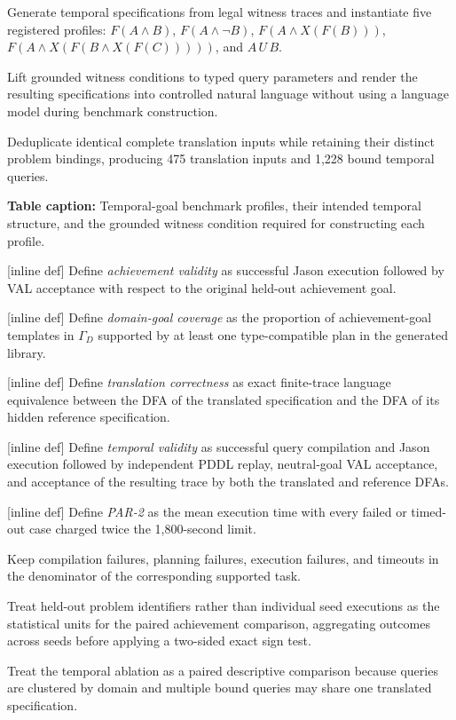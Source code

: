 Generate temporal specifications from legal witness traces and instantiate five registered profiles: \(F(A\land B)\), \(F(A\land\neg B)\), \(F(A\land X(F(B)))\), \(F(A\land X(F(B\land X(F(C)))))\), and \(A\,U\,B\).

Lift grounded witness conditions to typed query parameters and render the resulting specifications into controlled natural language without using a language model during benchmark construction.

Deduplicate identical complete translation inputs while retaining their distinct problem bindings, producing 475 translation inputs and 1,228 bound temporal queries.

\textbf{Table caption:} Temporal-goal benchmark profiles, their intended temporal structure, and the grounded witness condition required for constructing each profile.

[inline def] Define \emph{achievement validity} as successful Jason execution followed by VAL acceptance with respect to the original held-out achievement goal.

[inline def] Define \emph{domain-goal coverage} as the proportion of achievement-goal templates in \(\Gamma_D\) supported by at least one type-compatible plan in the generated library.

[inline def] Define \emph{translation correctness} as exact finite-trace language equivalence between the DFA of the translated specification and the DFA of its hidden reference specification.

[inline def] Define \emph{temporal validity} as successful query compilation and Jason execution followed by independent PDDL replay, neutral-goal VAL acceptance, and acceptance of the resulting trace by both the translated and reference DFAs.

[inline def] Define \emph{PAR-2} as the mean execution time with every failed or timed-out case charged twice the 1,800-second limit.

Keep compilation failures, planning failures, execution failures, and timeouts in the denominator of the corresponding supported task.

Treat held-out problem identifiers rather than individual seed executions as the statistical units for the paired achievement comparison, aggregating outcomes across seeds before applying a two-sided exact sign test.

Treat the temporal ablation as a paired descriptive comparison because queries are clustered by domain and multiple bound queries may share one translated specification.

